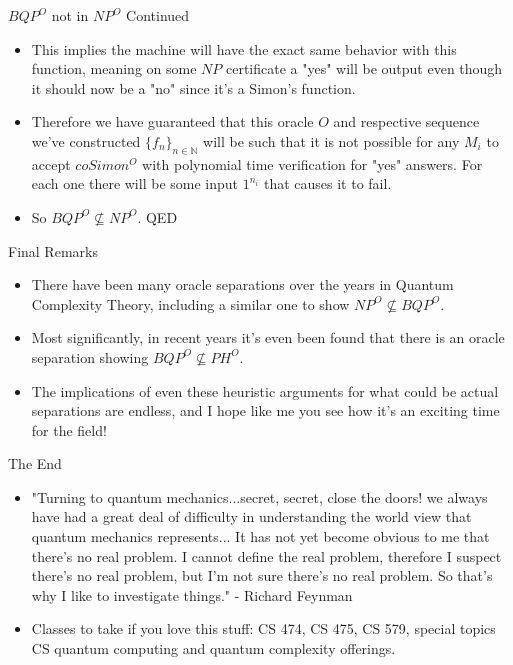 \documentclass[aspectratio=169]{beamer}
\begin{document}
\begin{frame}{$BQP^O$ not in $NP^O$ Continued}
  \begin{itemize}
    \begin{pf}
    \begin{itemize}
        \item This implies the machine will have the exact same behavior with this function, meaning on some $NP$ certificate a "yes" will be output even though it should now be a "no" since it's a Simon's function. \pause
        \item Therefore we have guaranteed that this oracle $O$ and respective sequence we've constructed $\{f_n\}_{n \in \mathbb{N}}$ will be such that it is not possible for any $M_i$ to accept $coSimon^O$ with polynomial time verification for "yes" answers. For each one there will be some input $1^{n_i}$ that causes it to fail. \pause
        \item So $BQP^O \nsubseteq NP^O$. QED
    \end{itemize}
    \end{pf}
  \end{itemize}
\end{frame}

\begin{frame}{Final Remarks}
  \begin{itemize}
    \item There have been many oracle separations over the years in Quantum Complexity Theory, including a similar one to show $NP^O \nsubseteq BQP^O$. \pause
    \item Most significantly, in recent years it's even been found that there is an oracle separation showing $BQP^O \nsubseteq PH^O$. \pause 
    \item The implications of even these heuristic arguments for what could be actual separations are endless, and I hope like me you see how it's an exciting time for the field!
  \end{itemize}
\end{frame}

\begin{frame}{The End}
  \begin{itemize}
    \item "Turning to quantum mechanics...secret, secret, close the doors! we always have had a great deal of difficulty in understanding the world view that quantum mechanics represents... It has not yet become obvious to me that there’s no real problem. I cannot define the real problem, therefore I suspect there’s no real problem, but I’m not sure there’s no real problem. So that’s why I like to investigate things." - Richard Feynman 
    \item Classes to take if you love this stuff: CS 474, CS 475, CS 579, special topics CS quantum computing and quantum complexity offerings.
  \end{itemize}
\end{frame}
\end{document}
